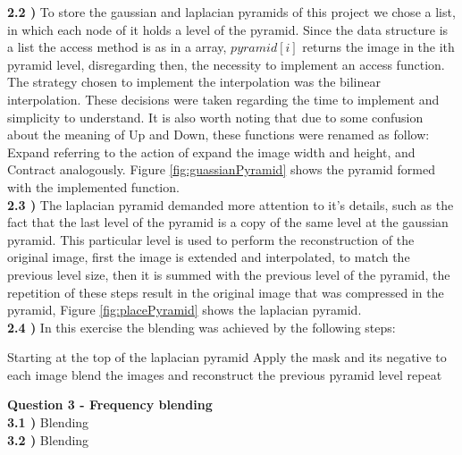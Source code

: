 \documentclass[12pt,a4paper]{article}
\begin{document}
\textbf{2.2 )} To store the gaussian and laplacian pyramids of this project we chose a list, in which each node of it holds a level of the pyramid. Since the data structure is a list the access method is as in a array, $pyramid[i]$ returns the image in the ith pyramid level, disregarding then, the necessity to implement an access function. The strategy chosen to implement the interpolation was the bilinear interpolation. These decisions were taken regarding the time to implement and simplicity to understand. It is also worth noting that due to some confusion about the meaning of Up and Down, these functions were renamed as follow: Expand referring to the action of expand the image width and height, and Contract analogously. Figure \ref{fig:guassianPyramid} shows the pyramid formed with the implemented function.\\

\textbf{2.3 )} The laplacian pyramid demanded more attention to it's details, such as the fact that the last level of the pyramid is a copy of the same level at the gaussian pyramid. This particular level is used to perform the reconstruction of the original image, first the image is extended and interpolated, to match the previous level size, then it is summed with the previous level of the pyramid, the repetition of these steps result in the original image that was compressed in the pyramid, Figure \ref{fig:placePyramid} shows the laplacian pyramid.\\

\textbf{2.4 )} In this exercise the blending was achieved by the following steps:


Starting at the top of the laplacian pyramid
Apply the mask and its negative to each image
blend the images and reconstruct the previous pyramid level
repeat

\textbf{Question 3 - Frequency blending}\\

\textbf{3.1 )} Blending\\

\textbf{3.2 )} Blending\\
 
\end{document}
